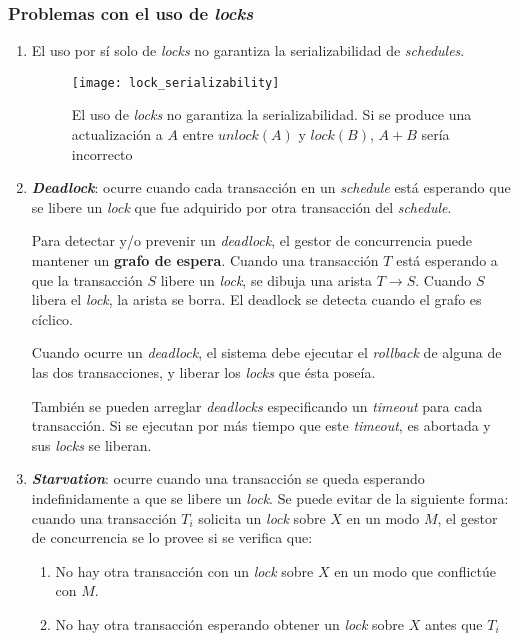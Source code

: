 \documentclass[a4paper, twoside]{article}
\begin{document}
\subsubsection{Problemas con el uso de \emph{locks}}
\begin{enumerate}
	\item El uso por sí solo de \emph{locks} no garantiza la serializabilidad de \emph{schedules}.
	\begin{figure}[H]
		\centering
		\texttt{[image: lock\_serializability]}
		\caption{El uso de \emph{locks} no garantiza la serializabilidad. Si se produce una actualización a $A$ entre $unlock(A)$ y $lock(B)$, \textbf{$A+B$} sería incorrecto}
	\end{figure}

	\item \textbf{\emph{Deadlock}}: ocurre cuando cada transacción en un \emph{schedule} está esperando que se libere un \emph{lock} que fue adquirido por otra transacción del \emph{schedule}.

	Para detectar y/o prevenir un \emph{deadlock}, el gestor de concurrencia puede mantener un \textbf{grafo de espera}. Cuando una transacción $T$ está esperando a que la transacción $S$ libere un \emph{lock}, se dibuja una arista $T\to S$. Cuando $S$ libera el \emph{lock}, la arista se borra. El deadlock se detecta cuando el grafo es cíclico.

	Cuando ocurre un \emph{deadlock}, el sistema debe ejecutar el \emph{rollback} de alguna de las dos transacciones, y liberar los \emph{locks} que ésta poseía.

	También se pueden arreglar \emph{deadlocks} especificando un \emph{timeout} para cada transacción. Si se ejecutan por más tiempo que este \emph{timeout}, es abortada y sus \emph{locks} se liberan.

	\item \textbf{\emph{Starvation}}: ocurre cuando una transacción se queda esperando indefinidamente a que se libere un \emph{lock}. Se puede evitar de la siguiente forma: cuando una transacción $T_{i}$ solicita un \emph{lock} sobre $X$ en un modo $M$, el gestor de concurrencia se lo provee si se verifica que:
	\begin{enumerate}
		\item No hay otra transacción con un \emph{lock }sobre $X$ en un modo que conflictúe con $M$.
		\item No hay otra transacción esperando obtener un \emph{lock }sobre $X$ antes que $T_{i}$
	\end{enumerate}
\end{enumerate}
\end{document}
